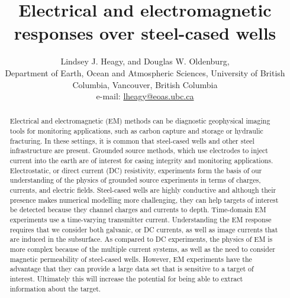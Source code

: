 \documentclass[
    paper
]{geophysics}
\begin{document}
\title{Electrical and electromagnetic responses over steel-cased wells}

\renewcommand{\thefootnote}{\fnsymbol{footnote}}

\ms{}  %



\author{%
Lindsey J. Heagy\footnotemark[1],
and %
Douglas W. Oldenburg\footnotemark[1], \\
\footnotemark[1]Department of Earth, Ocean and Atmospheric Sciences, University of British Columbia, Vancouver, British Columbia \\
e-mail: \href{mailto:lheagy@eoas.ubc.ca}{lheagy@eoas.ubc.ca}
}

\footer{}
\righthead{}

\maketitle

\begin{abstract}
  Electrical and electromagnetic (EM) methods can be diagnostic geophysical imaging tools for monitoring applications, such as carbon capture and storage or hydraulic fracturing. In these settings, it is common that steel-cased wells and other steel infrastructure are present. Grounded source methods, which use electrodes to inject current into the earth are of interest for casing integrity and monitoring applications. Electrostatic, or direct current (DC) resistivity, experiments form the basis of our understanding of the physics of grounded source experiments in terms of charges, currents, and electric fields. Steel-cased wells are highly conductive and although their presence makes numerical modelling more challenging, they can help targets of interest be detected because they channel charges and currents to depth. Time-domain EM experiments use a time-varying transmitter current. Understanding the EM response requires that we consider both galvanic, or DC currents, as well as image currents that are induced in the subsurface. As compared to DC experiments, the physics of EM is more complex because of the multiple current systems, as well as the need to consider magnetic permeability of steel-cased wells. However, EM experiments have the advantage that they can provide a large data set that is sensitive to a target of interest. Ultimately this will increase the potential for being able to extract information about the target.
\end{abstract}
\end{document}
